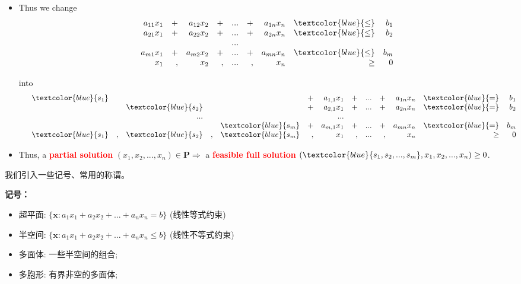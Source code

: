 \begin{itemize}
\item Thus we change
\[
\begin{array}{rrrrrrrrrrrrl}
   & a_{11}x_1 &+& a_{12}x_2 &+& ... &+& a_{1n}x_n & \textcolor{blue}{\leq} & b_1 &  \\
   & a_{21}x_1 &+& a_{22}x_2 &+& ... &+& a_{2n}x_n & \textcolor{blue}{\leq} & b_2 &  \\
   &           & &           & & ... & &           &      &     &  \\
   & a_{m1}x_1 &+& a_{m2}x_2 &+& ... &+& a_{mn}x_n & \textcolor{blue}{\leq} & b_m &  \\
   & x_1 &,& x_2 &,& ... &,& x_n & \geq & 0 &  \\
\end{array} \nonumber
\]

into
\[
\begin{array}{rrrrrrrrrrrrrrrrrl}
   &\textcolor{blue}{s_1}  & &     & &     &+& a_{1,1}x_{1} &+& ... &+& a_{1n}x_n & \textcolor{blue}{=} & b_1 &  \\
   &     & & \textcolor{blue}{s_2}   & &     &+& a_{2,1}x_{1} &+&... &+& a_{2n}x_n & \textcolor{blue}{=}  & b_2 &  \\
   &     & &  ...& &     & & ... & &           &      &     &  \\
   &     & &     & & \textcolor{blue}{s_m}   &+& a_{m,1}x_{1}&+&... &+& a_{mn}x_n & \textcolor{blue}{=}  & b_m &  \\
   & \textcolor{blue}{s_1} &,& \textcolor{blue}{s_2} &,& \textcolor{blue}{s_m} &,& x_{1}&,&... &,& x_n & \geq & 0 &
\end{array} \nonumber
\]

\item  Thus, a \textcolor{red}{\bf partial  solution} $(x_1, x_2, ..., x_n) \in \mathbf{P} \Rightarrow$ a \textcolor{red}{\bf feasible full solution} $(\textcolor{blue}{s_1,s_2,...,s_m}, x_1, x_2, ..., x_n) \geq 0$.
\end{itemize}

我们引入一些记号、常用的称谓。

\textbf{记号：}
\begin{itemize}
 \item 超平面: $\{ \mathbf{x}: a_1x_1 + a_2 x_2 + ... + a_n x_n = b \}$ (线性等式约束)
 \item 半空间: $\{ \mathbf{x}: a_1x_1 + a_2 x_2 + ... + a_n x_n \leq {b} \}$ (线性不等式约束)
 \item 多面体: 一些半空间的组合;
 \item 多胞形: 有界非空的多面体;
\end{itemize}

